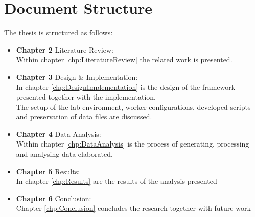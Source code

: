 \section{Document Structure}
\label{s:DocumentStructure}
The thesis is structured as follows:

\begin{itemize}
    \item \textbf{Chapter 2} Literature Review:\\
    Within chapter \ref{chp:LiteratureReview} the related work is presented.
    \item \textbf{Chapter 3} Design \& Implementation:\\
    In chapter \ref{chp:DesignImplementation} is the design of the framework presented together with the implementation.\\
    The setup of the lab environment, worker configurations, developed scripts and preservation of data files are discussed.
    \item \textbf{Chapter 4} Data Analysis:\\
    Within chapter \ref{chp:DataAnalysis} is the process of generating, processing and analysing data elaborated.
    \item \textbf{Chapter 5} Results:\\
    In chapter \ref{chp:Results} are the results of the analysis presented
    \item \textbf{Chapter 6} Conclusion:\\
    Chapter \ref{chp:Conclusion} concludes the research together with future work
\end{itemize}